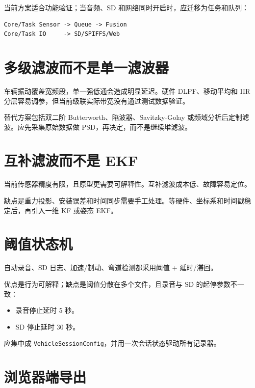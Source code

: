\documentclass[
  UTF8,11pt,a4paper]{ctexart}
\newcommand{\passthrough}[1]{#1}
\providecommand{\tightlist}{%
  \setlength{\itemsep}{0pt}\setlength{\parskip}{0pt}}
\begin{document}
当前方案适合功能验证；当音频、SD 和网络同时开启时，应迁移为任务和队列：

\begin{lstlisting}
Core/Task Sensor -> Queue -> Fusion
Core/Task IO     -> SD/SPIFFS/Web
\end{lstlisting}

\section{多级滤波而不是单一滤波器}\label{ux591aux7ea7ux6ee4ux6ce2ux800cux4e0dux662fux5355ux4e00ux6ee4ux6ce2ux5668}

车辆振动覆盖宽频段，单一强低通会造成明显延迟。硬件 DLPF、移动平均和 IIR
分层容易调参，但当前级联实际带宽没有通过测试数据验证。

替代方案包括双二阶 Butterworth、陷波器、Savitzky-Golay
或频域分析后定制滤波。应先采集原始数据做 PSD，再决定，而不是继续堆滤波。

\section{互补滤波而不是
EKF}\label{ux4e92ux8865ux6ee4ux6ce2ux800cux4e0dux662f-ekf}

当前传感器精度有限，且原型更需要可解释性。互补滤波成本低、故障容易定位。

缺点是重力投影、安装误差和时间同步需要手工处理。等硬件、坐标系和时间戳稳定后，再引入一维
KF 或姿态 EKF。

\section{阈值状态机}\label{ux9608ux503cux72b6ux6001ux673a}

自动录音、SD 日志、加速/制动、弯道检测都采用阈值 + 延时/滞回。

优点是行为可解释；缺点是阈值分散在多个文件，且录音与 SD
的起停参数不一致：

\begin{itemize}
\tightlist
\item
  录音停止延时 5 秒。
\item
  SD 停止延时 30 秒。
\end{itemize}

应集中成
\passthrough{\lstinline!VehicleSessionConfig!}，并用一次会话状态驱动所有记录器。

\section{浏览器端导出}\label{ux6d4fux89c8ux5668ux7aefux5bfcux51fa}
\end{document}

